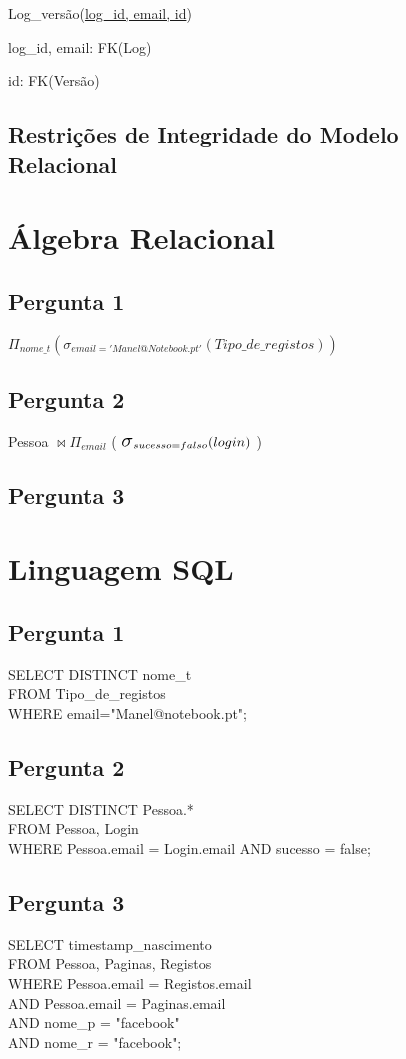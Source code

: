 \documentclass[11pt,a4paper]{article}
\newcommand{\select}{\mbox{\Large$\sigma$}}
\begin{document}
\begin{description}[noitemsep]
	\item Log\_vers\~{a}o(\underline{log\_id, email, id})
	\item log\_id, email: FK(Log)
	\item id: FK(Vers\~{a}o)
\end{description}

\subsection{Restri\c{c}\~oes de Integridade do Modelo Relacional}
\section{\'{A}lgebra Relacional}
\subsection{Pergunta 1}

$\Pi_{nome\_t}(\sigma_{email = 'Manel@Notebook.pt'}(Tipo\_de\_registos))$

\subsection{Pergunta 2}

Pessoa $\bowtie \Pi_{email}$ ( $\select_{sucesso=falso} (login)$ )

\subsection{Pergunta 3}








\section{Linguagem SQL}
\subsection{Pergunta 1}
SELECT DISTINCT nome\_t
\\FROM Tipo\_de\_registos
\\WHERE email="Manel@notebook.pt";

\subsection{Pergunta 2}
SELECT DISTINCT Pessoa.* 
\\FROM Pessoa, Login 
\\WHERE Pessoa.email = Login.email AND sucesso = false;

\subsection{Pergunta 3}
SELECT timestamp\_nascimento
\\FROM Pessoa, Paginas, Registos 
\\WHERE Pessoa.email = Registos.email 
\\AND Pessoa.email = Paginas.email 
\\AND nome\_p = "facebook" 
\\AND nome\_r = "facebook";
\end{document}
